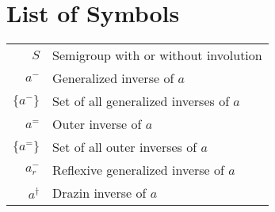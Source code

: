 
\chapter*{List of Symbols}

\begin{longtable}{rl}
$S$ & Semigroup with or without involution\\
$a^-$ & Generalized inverse of $a$\\
$\{a^-\}$ & Set of all generalized inverses of $a$\\
$a^=$ & Outer inverse of $a$\\
$\{a^=\}$ & Set of all outer inverses of $a$\\
$a^-_r$ & Reflexive generalized inverse of $a$ \\ 
$a^\dagger$ & Drazin inverse of $a$\\	
\end{longtable}



